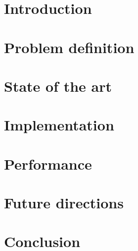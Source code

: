






\chapter{Introduction}


\chapter{Problem definition}


\chapter{State of the art}


\chapter{Implementation}


\chapter{Performance}


\chapter{Future directions}


\chapter{Conclusion}



 





